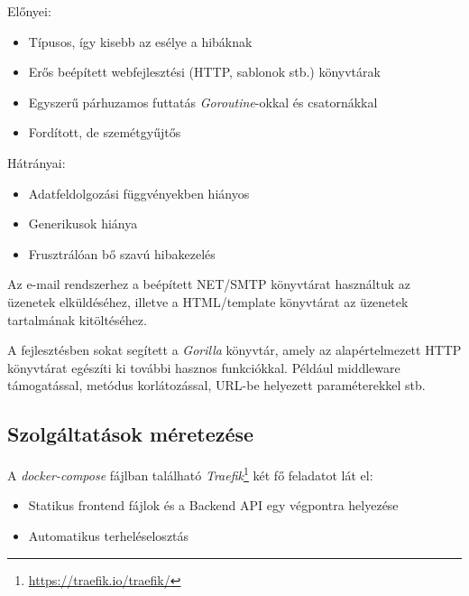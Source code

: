 \begin{samepage}
      \noindent Előnyei:
      \begin{itemize}
            \item Típusos, így kisebb az esélye a hibáknak
            \item Erős beépített webfejlesztési (HTTP, sablonok stb.) könyvtárak
            \item Egyszerű párhuzamos futtatás \emph{Goroutine}-okkal és csatornákkal
            \item Fordított, de szemétgyűjtős

      \end{itemize}
\end{samepage}

\begin{samepage}
      \noindent Hátrányai:
      \begin{itemize}
            \item Adatfeldolgozási függvényekben hiányos
            \item Generikusok hiánya
            \item Frusztrálóan bő szavú hibakezelés
      \end{itemize}
\end{samepage}

Az e-mail rendszerhez a beépített NET/SMTP könyvtárat használtuk az üzenetek elküldéséhez, illetve a HTML/template könyvtárat az üzenetek tartalmának kitöltéséhez.

A fejlesztésben sokat segített a \emph{Gorilla} könyvtár, amely az alapértelmezett HTTP könyvtárat egészíti ki további hasznos funkciókkal.
Például middleware támogatással, metódus korlátozással, URL-be helyezett paraméterekkel stb.

\subsection{Szolgáltatások méretezése}
A \emph{docker-compose} fájlban található \emph{Traefik}\footnote{\url{https://traefik.io/traefik/}} két fő feladatot lát el:

\begin{samepage}
      \begin{itemize}
            \item Statikus frontend fájlok és a Backend API egy végpontra helyezése
            \item Automatikus terheléselosztás
      \end{itemize}
\end{samepage}

